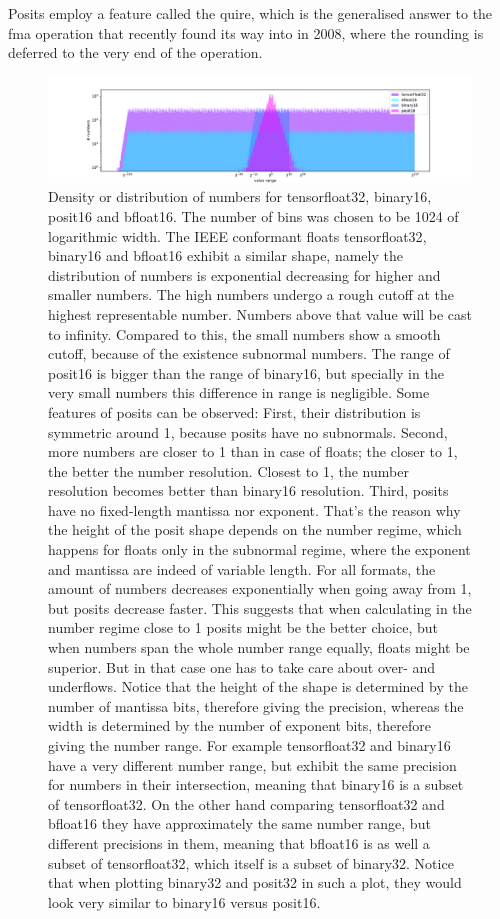 \documentclass{article}
\theoremstyle{plain} %
\theoremstyle{convention} %
\theoremstyle{remark} %
\numberwithin{equation}{section}
\begin{document}
Posits employ a feature called the \gls{quire}, which is the generalised answer to the \gls{fma} operation that recently found its way into \cite{ieee754_2008} in 2008, where the rounding is deferred to the very end of the operation.

\begin{figure}
    \centering
    \includegraphics[width=1.0\textwidth]{plots/number_line}
    \caption{Density or distribution of numbers for \gls{tensorfloat32}, \gls{binary16}, \gls{posit16} and \gls{bfloat16}. The number of bins was chosen to be \num{1024} of logarithmic width. The IEEE conformant floats \gls{tensorfloat32}, \gls{binary16} and \gls{bfloat16} exhibit a similar shape, namely the distribution of numbers is exponential decreasing for higher and smaller numbers. The high numbers undergo a rough cutoff at the highest representable number. Numbers above that value will be cast to infinity. Compared to this, the small numbers show a smooth cutoff, because of the existence subnormal numbers. The range of \gls{posit16} is bigger than the range of \gls{binary16}, but specially in the very small numbers this difference in range is negligible. Some features of posits can be observed: First, their distribution is symmetric around \num{1}, because posits have no subnormals. Second, more numbers are closer to \num{1} than in case of floats; the closer to \num{1}, the better the number resolution. Closest to \num{1}, the number resolution becomes better than \gls{binary16} resolution. Third, posits have no fixed-length mantissa nor exponent. That's the reason why the height of the posit shape depends on the number regime, which happens for floats only in the subnormal regime, where the exponent and mantissa are indeed of variable length. For all formats, the amount of numbers decreases exponentially when going away from \num{1}, but posits decrease faster. This suggests that when calculating in the number regime close to \num{1} posits might be the better choice, but when numbers span the whole number range equally, floats might be superior. But in that case one has to take care about over- and underflows. Notice that the height of the shape is determined by the number of mantissa bits, therefore giving the precision, whereas the width is determined by the number of exponent bits, therefore giving the number range. For example \gls{tensorfloat32} and \gls{binary16} have a very different number range, but exhibit the same precision for numbers in their intersection, meaning that \gls{binary16} is a subset of \gls{tensorfloat32}. On the other hand comparing \gls{tensorfloat32} and \gls{bfloat16} they have approximately the same number range, but different precisions in them, meaning that \gls{bfloat16} is as well a subset of \gls{tensorfloat32}, which itself is a subset of \gls{binary32}. Notice that when plotting \gls{binary32} and \gls{posit32} in such a plot, they would look very similar to \gls{binary16} versus \gls{posit16}.}

\end{figure}
\end{document}
